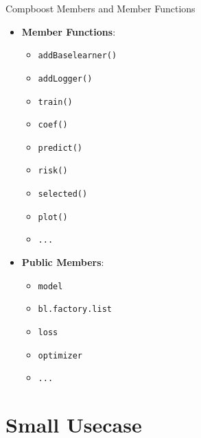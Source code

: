 \documentclass[10pt]{beamer}\usepackage[]{graphicx}\usepackage[]{color}
\begin{document}
\begin{frame}[fragile]{Compboost Members and Member Functions}

\begin{itemize}

	\item \textbf{Member Functions}:
	\begin{itemize}
	
	  \item \texttt{addBaselearner()}
	  \item \texttt{addLogger()}
	  \item \texttt{train()}
	  \item \texttt{coef()}
	  \item \texttt{predict()}
	  \item \texttt{risk()}
	  \item \texttt{selected()}
	  \item \texttt{plot()}
	  \item \texttt{...}

	\end{itemize}
  
	\item \textbf{Public Members}:
  \begin{itemize}
	
	  \item \texttt{model}
	  \item \texttt{bl.factory.list}
	  \item \texttt{loss}
	  \item \texttt{optimizer}
	  \item \texttt{...}

	\end{itemize}

\end{itemize}

\end{frame}

\section{Small Usecase}
\end{document}
